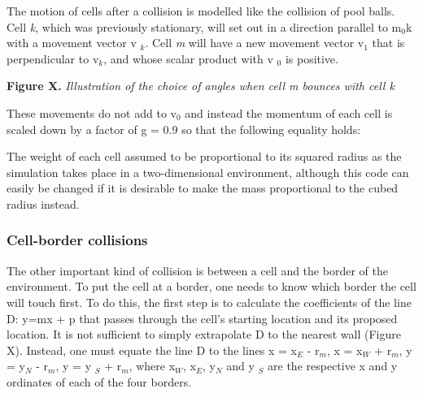 \documentclass[12pt,a4paper]{report}
\begin{document}
The motion of cells after a collision is modelled like the collision of 
pool balls. Cell {\itshape k}, which was previously stationary, will 
set out in a direction parallel to m$_{0}$k with a movement vector v
$_{k}$. Cell {\itshape m} will have a new movement vector v$_{1}$ 
that is perpendicular to v$_{k}$, and whose scalar product with v
$_{0}$ is positive.



\begin{figure}[H]
\centering
\end{figure}


{\bfseries Figure X. }{\itshape Illustration of the choice of angles when 
cell m bounces with cell k}



These movements do not add to v$_{0}$ and instead the momentum of 
each cell is scaled down by a factor of g = 0.9 so that the following 
equality holds:

\begin{figure}[H]
\centering
\end{figure}


The weight of each cell assumed to be proportional to its squared radius 
as the simulation takes place in a two-dimensional environment, although 
this code can easily be changed if it is desirable to make the mass 
proportional to the cubed radius instead.



\subsubsection{Cell-border collisions}
The other important kind of collision is between a cell and the border 
of the environment. To put the cell at a border, one needs to know which 
border the cell will touch first. To do this, the first step is to 
calculate the coefficients of the line D: y=mx + p that passes through 
the cell's starting location and its proposed location. It is not 
sufficient to simply extrapolate D to the nearest wall (Figure X). 
Instead, one must equate the line D to the lines x = x$_{E}$ - r$_{
m}$, x = x$_{W}$ + r$_{m}$, y = y$_{N}$ - r$_{m}$, y = y
$_{S}$ + r$_{m}$, where x$_{W}$, x$_{E}$, y$_{N}$ and y
$_{S}$ are the respective x and y ordinates of each of the four 
borders.



\begin{figure}[H]
\centering
\end{figure}
\end{document}

